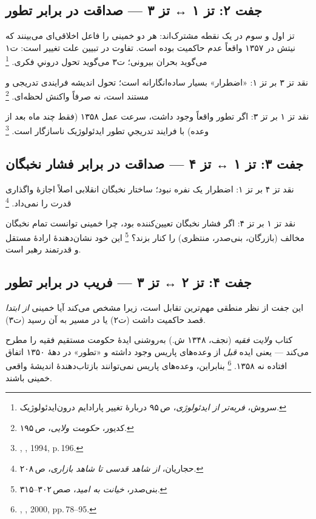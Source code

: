 \subsection{جفت ۲: تز ۱ ↔ تز ۳ — صداقت در برابر تطور}
\label{subsec:pair-t1t3}

\begin{noteBox}
تز اول و سوم در یک نقطه مشترک‌اند:
هر دو خمینی را فاعل اخلاقی‌ای می‌بینند که
نیتش در ۱۳۵۷ واقعاً عدم حاکمیت بوده است.
تفاوت در تبیین علت تغییر است:
ت‌۱ می‌گوید بحران بیرونی؛
ت‌۳ می‌گوید تحول درونیِ فکری.%
\footnote{سروش، \textit{فربه‌تر از ایدئولوژی}، ص\,۹۵
دربارهٔ تغییر پارادایم درون‌ایدئولوژیک.}
\end{noteBox}

نقد تز ۳ بر تز ۱:
«اضطرار» بسیار ساده‌انگارانه است؛
تحول اندیشه فرایندی تدریجی و مستند است،
نه صرفاً واکنش لحظه‌ای.%
\footnote{کدیور، \textit{حکومت ولایی}، ص\,۱۹۵.}

نقد تز ۱ بر تز ۳:
اگر تطور واقعاً وجود داشت،
سرعت عمل ۱۳۵۸ (فقط چند ماه بعد از وعده)
با فرایند تدریجیِ تطور ایدئولوژیک ناسازگار است.%
\footnote{,
\textit{}, 1994, p.\,196.}

\subsection{جفت ۳: تز ۱ ↔ تز ۴ — صداقت در برابر فشار نخبگان}
\label{subsec:pair-t1t4}

نقد تز ۴ بر تز ۱:
اضطرار یک نفره نبود؛ ساختار نخبگان انقلابی
اصلاً اجازهٔ واگذاری قدرت را نمی‌داد.%
\footnote{حجاریان، \textit{از شاهد قدسی تا شاهد بازاری}، ص\,۲۰۸.}

نقد تز ۱ بر تز ۴:
اگر فشار نخبگان تعیین‌کننده بود،
چرا خمینی توانست تمام نخبگان مخالف
(بازرگان، بنی‌صدر، منتظری) را کنار بزند؟%
\footnote{بنی‌صدر، \textit{خیانت به امید}، صص\,۳۰۲–۳۱۵.}
این خود نشان‌دهندهٔ ارادهٔ مستقل و قدرتمند رهبر است.

\subsection{جفت ۴: تز ۲ ↔ تز ۳ — فریب در برابر تطور}
\label{subsec:pair-t2t3}

این جفت از نظر منطقی مهم‌ترین تقابل است،
زیرا مشخص می‌کند آیا خمینی
\emph{از ابتدا} قصد حاکمیت داشت (ت‌۲)
یا در مسیر به آن رسید (ت‌۳).

\begin{warningBox}[نقد تز ۲ بر تز ۳]
کتاب \textit{ولایت فقیه} (نجف، ۱۳۴۸ ش.)
به‌روشنی ایدهٔ حکومت مستقیم فقیه را مطرح می‌کند —
یعنی ایده \emph{قبل} از وعده‌های پاریس وجود داشته
و «تطور» در دههٔ ۱۳۵۰ اتفاق افتاده نه ۱۳۵۸.%
\footnote{%
,
\textit{}, 2000, pp.\,78–95.}
بنابراین، وعده‌های پاریس نمی‌توانند
بازتاب‌دهندهٔ اندیشهٔ واقعی خمینی باشند.
\end{warningBox}

